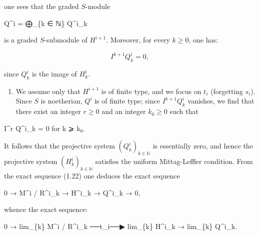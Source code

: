 \documentclass[
]{article}
\newenvironment{Shaded}{}{}
\newcommand{\NormalTok}[1]{#1}
\providecommand{\tightlist}{%
  \setlength{\itemsep}{0pt}\setlength{\parskip}{0pt}}
\begin{document}
one sees that the graded \(S\)-module

\begin{Shaded}
\begin{Highlighting}[]
\NormalTok{Q\^{}i = ⨁\_\{k ∈ ℕ\} Q\^{}i\_k}
\end{Highlighting}
\end{Shaded}

is a graded \(S\)-submodule of \(H^{i+1}\). Moreover, for every
\(k \geqslant 0\), one has:

\[
I^{k+1} Q^{i}_{k} = 0,
\]

since \(Q^{i}_{k}\) is the image of \(H^{i}_{k}\).

\begin{enumerate}
\def\labelenumi{(\alph{enumi})}
\setcounter{enumi}{1}
\tightlist
\item
  We assume only that \(H^{i+1}\) is of finite type, and we focus on
  \(t_{i}\) (forgetting \(s_{i}\)). Since \(S\) is noetherian, \(Q^{i}\)
  is of finite type; since \(I^{k+1} Q^{i}_{k}\) vanishes, we find that
  there exist an integer \(r \geqslant 0\) and an integer
  \(k_{0} \geqslant 0\) such that
\end{enumerate}

\begin{Shaded}
\begin{Highlighting}[]
\NormalTok{I\^{}r Q\^{}i\_k = 0    for k ⩾ k₀.}
\end{Highlighting}
\end{Shaded}

It follows that the projective system \((Q^{i}_{k})_{k \in \mathbb{N}}\)
is essentially zero, and hence the projective system
\((H^{i}_{k})_{k \in \mathbb{N}}\) satisfies the uniform Mittag-Leffler
condition. From the exact sequence (1.22) one deduces the exact sequence

\begin{Shaded}
\begin{Highlighting}[]
\NormalTok{0 → M\^{}i / R\^{}i\_k → H\^{}i\_k → Q\^{}i\_k → 0,}
\end{Highlighting}
\end{Shaded}

whence the exact sequence:

\begin{Shaded}
\begin{Highlighting}[]
\NormalTok{0 → lim\_\{k\} M\^{}i / R\^{}i\_k  ──t\_i──▶  lim\_\{k\} H\^{}i\_k → lim\_\{k\} Q\^{}i\_k.}
\end{Highlighting}
\end{Shaded}
\end{document}
